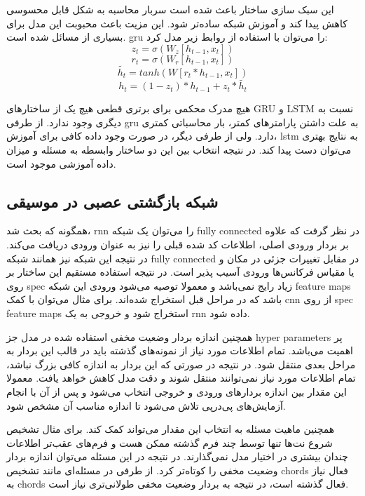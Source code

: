 این سبک سازی ساختار باعث شده است سربار محاسبه به شکل قابل محسوسی کاهش پیدا کند و
آموزش شبکه ساده‌تر شود. این مزیت باعث محبوبت این مدل برای بسیاری از مسائل شده
است. \gls{gru} را می‌توان با استفاده از روابط زیر مدل کرد:
\begin{equation}
    z_t = \sigma(W_z [h_{t-1},x_t])
\end{equation}
\begin{equation}
    r_t = \sigma(W_r [h_{t-1},x_t])
\end{equation}
\begin{equation}
    \tilde{h_t} = tanh(W [r_t * h_{t-1}, x_t])
\end{equation}
\begin{equation}
    h_t = (1 - z_t) * h_{t-1} + z_t * \tilde{h_t}
\end{equation}

هیچ مدرک محکمی برای برتری قطعی هیچ یک از ساختارهای \gls{GRU} و \gls{LSTM} نسبت
به دیگری وجود ندارد. از طرفی \gls{gru} به علت داشتن پارامترهای کمتر، بار
محاسباتی کمتری دارد. ولی از طرفی دیگر، در صورت وجود داده کافی برای آموزش،
\gls{lstm} به نتایج بهتری می‌توان دست پیدا کند. در نتیجه انتخاب بین این دو
ساختار وابسطه به مسئله و میزان داده آموزشی موجود است.

\subsection{شبکه بازگشتی عصبی در موسیقی}
همگونه که بحث شد، \gls{rnn} را می‌توان یک شبکه \gls{fully connected} در نظر گرفت
که علاوه بر بردار ورودی اصلی، اطلاعات کد شده قبلی را نیز به عنوان ورودی دریافت
می‌کند. در نتیجه این شبکه نیز همانند شبکه \gls{fully connected} در مقابل تغییرات
جزئی در مکان و یا مقیاس فرکانس‌ها ورودی آسیب پذیر است. در نتیجه استفاده مستقیم
این ساختار بر روی \gls{spec} زیاد رایج نمی‌باشد و معمولا توصیه می‌شود ورودی این
شبکه \glspl{feature map} باشد که در مراحل قبل استخراج شده‌اند. برای مثال می‌توان
با کمک \gls{cnn} از روی \gls{spec} \glspl{feature map} استخراج شود و خروجی به یک
\gls{rnn} داده شود.

همچنین اندازه بردار وضعیت مخفی استفاده شده در مدل جز \glspl{hyper parameter} پر
اهمیت می‌باشد. تمام اطلاعات مورد نیاز از نمونه‌های گذشته باید در قالب این بردار
به مراحل بعدی منتقل شود. در نتیجه در صورتی که این بردار به اندازه کافی بزرگ
نباشد، تمام اطلاعات مورد نیاز نمی‌توانند منتقل شوند و دقت مدل کاهش خواهد یافت.
معمولا این مقدار بین اندازه بردارهای ورودی و خروجی انتخاب می‌شود و پس از آن با
انجام آزمایش‌های پی‌در‌پی تلاش می‌شود تا اندازه مناسب آن مشخص شود.

همچنین ماهیت مسئله به انتخاب این مقدار می‌تواند کمک کند. برای مثال تشخیص شروع
نت‌ها تنها توسط چند فرم گذشته ممکن هست و فرم‌های عقب‌تر اطلاعات چندان بیشتری در
اختیار مدل نمی‌گذارند. در نتیجه در این مسئله می‌توان اندازه بردار وضعیت مخفی را
کوتاه‌تر کرد. از طرفی در مسئله‌ای مانند تشخیص \glspl{chord} فعال نیاز به
\glspl{chord} فعال گذشته است، در نتیجه به بردار وضعیت مخفی طولانی‌تری نیاز است.

